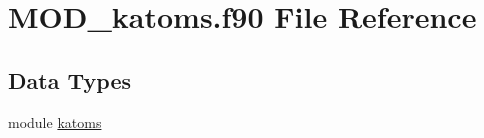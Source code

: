 \hypertarget{MOD__katoms_8f90}{\section{M\-O\-D\-\_\-katoms.\-f90 File Reference}
\label{MOD__katoms_8f90}
}
\subsection*{Data Types}
\begin{DoxyCompactItemize}
\item 
module \hyperlink{classkatoms}{katoms}
\end{DoxyCompactItemize}
